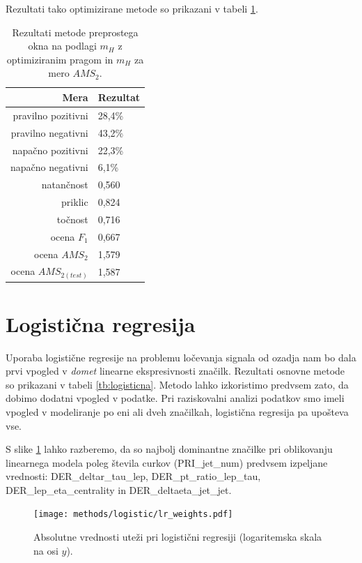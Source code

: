 \documentclass[11pt,a4paper,openany]{book}
\begin{document}
Rezultati tako optimizirane metode so prikazani v tabeli \ref{tb:preprosto_okno_2d_optimized}.

\begin{table}[ht]
	\centering
	\begin{tabular}{rl}
		\hline
		\textbf{Mera} & \textbf{Rezultat} \\
		\hline
		pravilno pozitivni & 28,4\%\\
		pravilno negativni & 43,2\% \\
		napačno pozitivni & 22,3\% \\
		napačno negativni & 6,1\% \\
		natančnost & 0,560 \\
		priklic & 0,824 \\
		točnost & 0,716 \\
		ocena $F_1$ & 0,667 \\
		ocena $AMS_2$ & 1,579 \\
		ocena $AMS_{2(test)}$ & 1,587 		
	\end{tabular}
	\caption{Rezultati metode preprostega okna na podlagi $m_H$ z optimiziranim pragom in $m_H$ za mero $AMS_2$.}
	\label{tb:preprosto_okno_2d_optimized}
\end{table}

\section{Logistična regresija}
Uporaba logistične regresije na problemu ločevanja signala od ozadja nam bo dala prvi vpogled v \textit{domet} linearne ekspresivnosti značilk. Rezultati osnovne metode so prikazani v tabeli \ref{tb:logisticna}. Metodo lahko izkoristimo predvsem zato, da dobimo dodatni vpogled v podatke. Pri raziskovalni analizi podatkov smo imeli vpogled v modeliranje po eni ali dveh značilkah, logistična regresija pa upošteva vse. 

S slike \ref{sl:logistic_weights} lahko razberemo, da so najbolj dominantne značilke pri oblikovanju linearnega modela poleg števila curkov (PRI\_jet\_num) predvsem izpeljane vrednosti: DER\_deltar\_tau\_lep, DER\_pt\_ratio\_lep\_tau, DER\_lep\_eta\_centrality in DER\_deltaeta\_jet\_jet.

\begin{figure}[h]
	\centering	
	\texttt{[image: methods/logistic/lr\_weights.pdf]}
	
	\caption{Absolutne vrednosti uteži pri logistični regresiji (logaritemska skala na osi $y$).}
	\label{sl:logistic_weights}
\end{figure}
\end{document}
